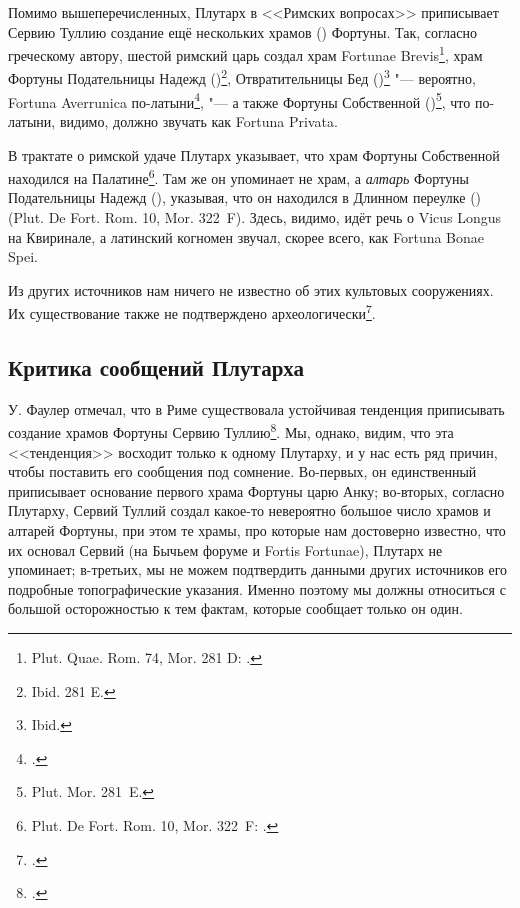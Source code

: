 Помимо вышеперечисленных, Плутарх в <<Римских вопросах>> приписывает Сервию Туллию создание ещё нескольких храмов () Фортуны. Так, согласно греческому автору, шестой римский царь создал храм Fortunae Brevis\footnote{Plut. Quae. Rom. 74, Mor. 281 D: .}, храм Фортуны Подательницы Надежд ()\footnote{Ibid. 281 E.}, Отвратительницы Бед ()\footnote{Ibid.} "--- вероятно, Fortuna Averrunica по-латыни\footcite[P. 155]{Richardson1992}, "--- а также Фортуны Собственной ()\footnote{Plut. Mor. 281~E.}, что по-латыни, видимо, должно звучать как Fortuna Privata.

В трактате о римской удаче Плутарх указывает, что храм Фортуны Собственной находился на Палатине\footnote{Plut. De Fort. Rom. 10, Mor. 322~F: .}. Там же он упоминает не храм, а \textit{алтарь} Фортуны Подательницы Надежд (), указывая, что он находился в Длинном переулке () (Plut. De Fort. Rom. 10, Mor. 322~F). Здесь, видимо, идёт речь о Vicus Longus на Квиринале, а латинский когномен звучал, скорее всего, как Fortuna Bonae Spei.

Из других источников нам ничего не известно об этих культовых сооружениях. Их существование также не подтверждено археологически\footcite[Pp. 155--158]{Richardson1992}.


\subsection{Критика сообщений Плутарха}\label{PlutarchiCritica}

У. Фаулер отмечал, что в Риме существовала устойчивая тенденция приписывать создание храмов Фортуны Сервию Туллию\footcite[P. 68]{Fowler1899}. Мы, однако, видим, что эта <<тенденция>> восходит только к одному Плутарху, и у нас есть ряд причин, чтобы поставить его сообщения под сомнение. Во-первых, он единственный приписывает основание первого храма Фортуны царю Анку; во-вторых, согласно Плутарху, Сервий Туллий создал какое-то невероятно большое число храмов и алтарей Фортуны, при этом те храмы, про которые нам достоверно известно, что их основал Сервий (на Бычьем форуме и Fortis Fortunae), Плутарх не упоминает; в-третьих, мы не можем подтвердить данными других источников его подробные топографические указания. Именно поэтому мы должны относиться с большой осторожностью к тем фактам, которые сообщает только он один.

